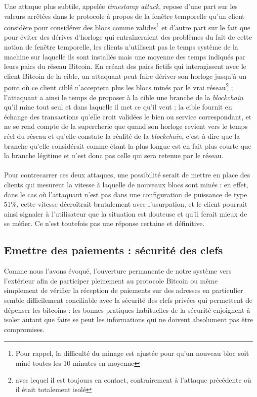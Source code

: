 \documentclass[11pt,a4paper]{article}
\begin{document}
Une attaque plus subtile, appelée \textit{timestamp attack}, repose d'une part sur les valeurs arrêtées dans le protocole à propos de la fenêtre temporelle qu'un client considère pour considérer des blocs comme valides\footnote{Pour rappel, la difficulté du minage est ajustée pour qu'un nouveau bloc soit miné toutes les 10 minutes en moyenne} et d'autre part sur le fait que pour éviter des dérives d'horloge qui entraîneraient des problèmes du fait de cette notion de fenêtre temporelle, les clients n'utilisent pas le temps système de la machine sur laquelle ils sont installés mais une moyenne des temps indiqués par leurs pairs du réseau Bitcoin. En créant des pairs fictifs qui interagissent avec le client Bitcoin de la cible, un attaquant peut faire dériver son horloge jusqu'à un point où ce client ciblé n'acceptera plus les blocs minés par le vrai réseau\footnote{avec lequel il est toujours en contact, contrairement à l'attaque précédente où il était totalement isolé} ; l'attaquant a ainsi le temps de proposer à la cible une branche de la \textit{blockchain} qu'il mine tout seul et dans laquelle il met ce qu'il veut ; la cible fournit en échange des transactions qu'elle croit validées le bien ou service correspondant, et ne se rend compte de la supercherie que quand son horloge revient vers le temps réel du réseau et qu'elle constate la réalité de la \textit{blockchain}, c'est à dire que la branche qu'elle considérait comme étant la plus longue est en fait plus courte que la branche légitime et n'est donc pas celle qui sera retenue par le réseau.\\\\
Pour contrecarrer ces deux attaques, une possibilité serait de mettre en place des clients qui mesurent la vitesse à laquelle de nouveaux blocs sont minés : en effet, dans le cas où l'attaquant n'est pas dans une configuration de puissance de type 51\%, cette vitesse décroîtrait brutalement avec l'usurpation, et le client pourrait ainsi signaler à l'utilisateur que la situation est douteuse et qu'il ferait mieux de se méfier. Ce n'est toutefois pas une réponse certaine et définitive.
\subsection{Emettre des paiements : sécurité des clefs}
Comme nous l'avons évoqué, l'ouverture permanente de notre système vers l'extérieur afin de participer pleinement au protocole Bitcoin ou même simplement de vérifier la réception de paiements sur des adresses en particulier semble difficilement conciliable avec la sécurité des clefs privées qui permettent de dépenser les bitcoins : les bonnes pratiques habituelles de la sécurité enjoignent à isoler autant que faire se peut les informations qui ne doivent absolument pas être compromises.
\end{document}

